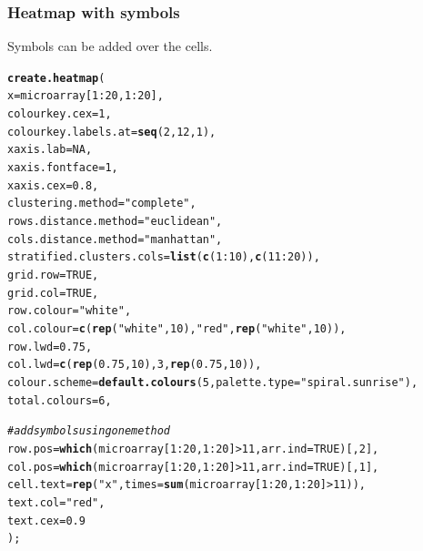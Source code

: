 \documentclass[letterpaper]{report}\usepackage[]{graphicx}\usepackage[]{color}
\makeatletter
\newcommand{\hlnum}[1]{\textcolor[rgb]{0.686,0.059,0.569}{#1}}%
\newcommand{\hlstr}[1]{\textcolor[rgb]{0.192,0.494,0.8}{#1}}%
\newcommand{\hlcom}[1]{\textcolor[rgb]{0.678,0.584,0.686}{\textit{#1}}}%
\newcommand{\hlopt}[1]{\textcolor[rgb]{0,0,0}{#1}}%
\newcommand{\hlstd}[1]{\textcolor[rgb]{0.345,0.345,0.345}{#1}}%
\newcommand{\hlkwc}[1]{\textcolor[rgb]{0.333,0.667,0.333}{#1}}%
\newcommand{\hlkwd}[1]{\textcolor[rgb]{0.737,0.353,0.396}{\textbf{#1}}}%
\newenvironment{kframe}{%
 \def\at@end@of@kframe{}%
 \ifinner\ifhmode%
  \def\at@end@of@kframe{\end{minipage}}%
  \begin{minipage}{\columnwidth}%
 \fi\fi%
 \def\FrameCommand##1{\hskip\@totalleftmargin \hskip-\fboxsep
 \colorbox{shadecolor}{##1}\hskip-\fboxsep
     \hskip-\linewidth \hskip-\@totalleftmargin \hskip\columnwidth}%
 \MakeFramed {\advance\hsize-\width
   \@totalleftmargin\z@ \linewidth\hsize
   \@setminipage}}%
 {\par\unskip\endMakeFramed%
 \at@end@of@kframe}
\newenvironment{knitrout}{}{} %
\makeatother
\begin{document}
\subsubsection{Heatmap with symbols}
Symbols can be added over the cells.

\begin{knitrout}
\color{fgcolor}\begin{kframe}
\begin{alltt}
\hlkwd{create.heatmap}\hlstd{(}
    \hlkwc{x} \hlstd{= microarray[}\hlnum{1}\hlopt{:}\hlnum{20}\hlstd{,} \hlnum{1}\hlopt{:}\hlnum{20}\hlstd{],}
    \hlkwc{colourkey.cex} \hlstd{=} \hlnum{1}\hlstd{,}
    \hlkwc{colourkey.labels.at} \hlstd{=} \hlkwd{seq}\hlstd{(}\hlnum{2}\hlstd{,} \hlnum{12}\hlstd{,} \hlnum{1}\hlstd{),}
    \hlkwc{xaxis.lab} \hlstd{=} \hlnum{NA}\hlstd{,}
    \hlkwc{xaxis.fontface} \hlstd{=} \hlnum{1}\hlstd{,}
    \hlkwc{xaxis.cex} \hlstd{=} \hlnum{0.8}\hlstd{,}
    \hlkwc{clustering.method} \hlstd{=} \hlstr{"complete"}\hlstd{,}
    \hlkwc{rows.distance.method} \hlstd{=} \hlstr{"euclidean"}\hlstd{,}
    \hlkwc{cols.distance.method} \hlstd{=} \hlstr{"manhattan"}\hlstd{,}
    \hlkwc{stratified.clusters.cols} \hlstd{=} \hlkwd{list}\hlstd{(}\hlkwd{c}\hlstd{(}\hlnum{1}\hlopt{:}\hlnum{10}\hlstd{),} \hlkwd{c}\hlstd{(}\hlnum{11}\hlopt{:}\hlnum{20}\hlstd{)),}
    \hlkwc{grid.row} \hlstd{=} \hlnum{TRUE}\hlstd{,}
    \hlkwc{grid.col} \hlstd{=} \hlnum{TRUE}\hlstd{,}
    \hlkwc{row.colour} \hlstd{=} \hlstr{"white"}\hlstd{,}
    \hlkwc{col.colour} \hlstd{=} \hlkwd{c}\hlstd{(}\hlkwd{rep}\hlstd{(}\hlstr{"white"}\hlstd{,} \hlnum{10}\hlstd{),} \hlstr{"red"}\hlstd{,} \hlkwd{rep}\hlstd{(}\hlstr{"white"}\hlstd{,}\hlnum{10}\hlstd{)),}
    \hlkwc{row.lwd} \hlstd{=} \hlnum{0.75}\hlstd{,}
    \hlkwc{col.lwd} \hlstd{=} \hlkwd{c}\hlstd{(}\hlkwd{rep}\hlstd{(}\hlnum{0.75}\hlstd{,} \hlnum{10}\hlstd{),} \hlnum{3}\hlstd{,} \hlkwd{rep}\hlstd{(}\hlnum{0.75}\hlstd{,}\hlnum{10}\hlstd{)),}
   \hlkwc{colour.scheme} \hlstd{=} \hlkwd{default.colours}\hlstd{(}\hlnum{5}\hlstd{,} \hlkwc{palette.type} \hlstd{=} \hlstr{"spiral.sunrise"}\hlstd{),}
   \hlkwc{total.colours} \hlstd{=} \hlnum{6}\hlstd{,}

   \hlcom{# add symbols using one method}
   \hlkwc{row.pos} \hlstd{=} \hlkwd{which}\hlstd{(microarray[}\hlnum{1}\hlopt{:}\hlnum{20}\hlstd{,} \hlnum{1}\hlopt{:}\hlnum{20}\hlstd{]} \hlopt{>} \hlnum{11}\hlstd{,} \hlkwc{arr.ind} \hlstd{=} \hlnum{TRUE}\hlstd{)[,}\hlnum{2}\hlstd{],}
   \hlkwc{col.pos} \hlstd{=} \hlkwd{which}\hlstd{(microarray[}\hlnum{1}\hlopt{:}\hlnum{20}\hlstd{,} \hlnum{1}\hlopt{:}\hlnum{20}\hlstd{]} \hlopt{>} \hlnum{11}\hlstd{,} \hlkwc{arr.ind} \hlstd{=} \hlnum{TRUE}\hlstd{)[,}\hlnum{1}\hlstd{],}
   \hlkwc{cell.text} \hlstd{=} \hlkwd{rep}\hlstd{(}\hlstr{"x"}\hlstd{,} \hlkwc{times} \hlstd{=} \hlkwd{sum}\hlstd{(microarray[}\hlnum{1}\hlopt{:}\hlnum{20}\hlstd{,} \hlnum{1}\hlopt{:}\hlnum{20}\hlstd{]} \hlopt{>} \hlnum{11}\hlstd{)),}
   \hlkwc{text.col} \hlstd{=} \hlstr{"red"}\hlstd{,}
   \hlkwc{text.cex} \hlstd{=} \hlnum{0.9}
   \hlstd{);}
\end{alltt}
\end{kframe}\begin{figure}


\end{figure}
\end{knitrout}
\end{document}
